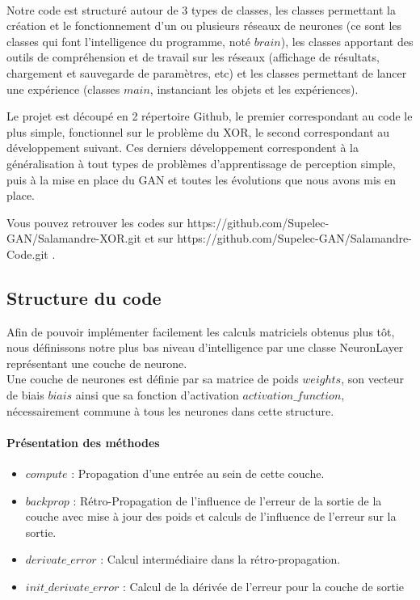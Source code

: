 \paragraph*{} %
Notre code est structuré autour de 3 types de classes, les classes permettant la création et le fonctionnement d'un ou plusieurs réseaux de neurones (ce sont les classes qui font l'intelligence du programme, noté $brain$), les classes apportant des outils de compréhension et de travail sur les réseaux (affichage de résultats, chargement et sauvegarde de paramètres, etc) et les classes permettant de lancer une expérience (classes $main$, instanciant les objets et les expériences).

Le projet est découpé en 2 répertoire Github, le premier correspondant au code le plus simple, fonctionnel sur le problème du XOR, le second correspondant au développement suivant. Ces derniers développement correspondent à la généralisation à tout types de problèmes d'apprentissage de perception simple, puis à la mise en place du GAN et toutes les évolutions que nous avons mis en place.

Vous pouvez retrouver les codes sur https://github.com/Supelec-GAN/Salamandre-XOR.git et sur https://github.com/Supelec-GAN/Salamandre-Code.git .

\subsection{Structure du code} %
\label{sub:structure_du_code}

Afin de pouvoir implémenter facilement les calculs matriciels obtenus plus tôt, nous définissons notre plus bas niveau d'intelligence par une classe NeuronLayer représentant une couche de neurone. \\

Une couche de neurones est définie par sa matrice de poids $weights$, son vecteur de biais $biais$ ainsi que sa fonction d'activation $activation\_function$, nécessairement commune à tous les neurones dans cette structure.

\paragraph{Présentation des méthodes} %
 \label{par:presentatation_des_methodes}
 
 \begin{itemize}
 	\item $compute$ : Propagation d'une entrée au sein de cette couche.
 	\item $backprop$ : Rétro-Propagation de l'influence de l'erreur de la sortie de la couche avec mise à jour des poids et calculs de l'influence de l'erreur sur la sortie.
  \item $derivate\_error$ : Calcul intermédiaire dans la rétro-propagation.
  \item  $init\_derivate\_error$ : Calcul de la dérivée de l'erreur pour la couche de sortie
 \end{itemize}

